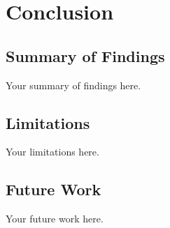 \chapter{Conclusion}
\section{Summary of Findings}
Your summary of findings here.
\section{Limitations}
Your limitations here.
\section{Future Work}
Your future work here.
